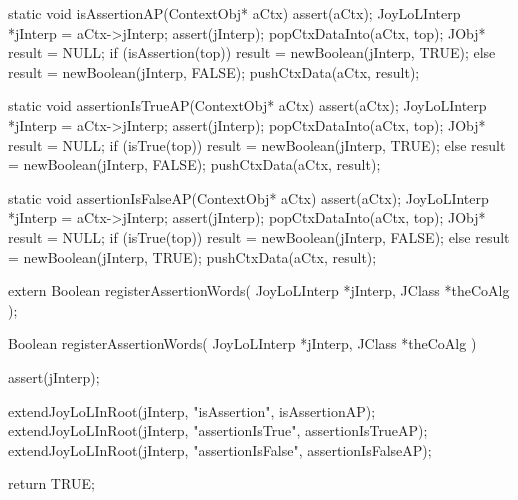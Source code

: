 \startCCode
static void isAssertionAP(ContextObj* aCtx) {
  assert(aCtx);
  JoyLoLInterp *jInterp = aCtx->jInterp;
  assert(jInterp);
  popCtxDataInto(aCtx, top);
  JObj* result = NULL;
  if (isAssertion(top))
    result = newBoolean(jInterp, TRUE);
  else
    result = newBoolean(jInterp, FALSE);
  pushCtxData(aCtx, result);
}
\stopCCode
\stopJoyLoLWord

\startJoyLoLWord[assertionIsTrue]
\startCCode
static void assertionIsTrueAP(ContextObj* aCtx) {
  assert(aCtx);
  JoyLoLInterp *jInterp = aCtx->jInterp;
  assert(jInterp);
  popCtxDataInto(aCtx, top);
  JObj* result = NULL;
  if (isTrue(top)) {
    result = newBoolean(jInterp, TRUE);
  } else {
    result = newBoolean(jInterp, FALSE);
  }
  pushCtxData(aCtx, result);
}
\stopCCode
\stopJoyLoLWord

\startJoyLoLWord[assertionIsFalse]

\startCCode
static void assertionIsFalseAP(ContextObj* aCtx) {
  assert(aCtx);
  JoyLoLInterp *jInterp = aCtx->jInterp;
  assert(jInterp);
  popCtxDataInto(aCtx, top);
  JObj* result = NULL;
  if (isTrue(top)) {
    result = newBoolean(jInterp, FALSE);
  } else {
    result = newBoolean(jInterp, TRUE);
  }
  pushCtxData(aCtx, result);
}
\stopCCode
\stopJoyLoLWord

\startCHeader
extern Boolean registerAssertionWords(
  JoyLoLInterp *jInterp,
  JClass       *theCoAlg
);
\stopCHeader
{}

\startCCode
Boolean registerAssertionWords(
  JoyLoLInterp *jInterp,
  JClass       *theCoAlg
) {
  assert(jInterp);
  
  extendJoyLoLInRoot(jInterp, "isAssertion",      isAssertionAP);
  extendJoyLoLInRoot(jInterp, "assertionIsTrue",  assertionIsTrueAP);
  extendJoyLoLInRoot(jInterp, "assertionIsFalse", assertionIsFalseAP);

  return TRUE;
}
\stopCCode
